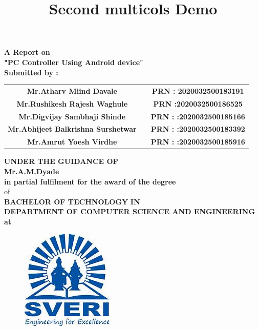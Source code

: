 \documentclass[12pt]{article}
\title{Second multicols Demo}
\begin{document}
 \begin{center}
 \large \textbf {A Report on}\\[2mm]
 \LARGE \textbf {"PC Controller Using Android device"}\\[2mm]
 
 \textbf{Submitted by :}\\[2mm]
 \end{center}
 
 
 \begin{tabular}{ c c c } 
 \textbf{Mr.Atharv Miind Davale} & \hspace{1in} & \textbf{ PRN :  2020032500183191} \\ [1mm] 
 \textbf {Mr.Rushikesh Rajesh Waghule} & \hspace{1in} & \textbf{PRN :2020032500186525}\\[1mm]
 \textbf{ Mr.Digvijay Sambhaji Shinde } & \hspace{1in}  & \textbf{PRN : :2020032500185166}\\[1mm]
\textbf{ Mr.Abhijeet Balkrishna Surshetwar} & \hspace{1in}  & \textbf{PRN : :2020032500183392}\\[1mm]
\textbf{ Mr.Amrut Yoesh Virdhe} & \hspace{1in}  & \textbf{PRN : :2020032500185916}\\[7mm] 
\end{tabular} 
 
 
 
 \begin{center}
 \large \textbf {UNDER THE GUIDANCE OF }\\[2mm]
 \large \textbf {Mr.A.M.Dyade}\\[7mm]
 \textbf {in partial fulfilment for the award of the degree} \\[2mm] of \\[2mm]
 
 \large \textbf {BACHELOR OF TECHNOLOGY}
 \textbf {IN}\\[2mm]
 \textbf {DEPARTMENT OF COMPUTER SCIENCE AND ENGINEERING}\\
 \textbf {at}
 \end{center}
 
 \begin{figure}[h]
 \centering
 \includegraphics[scale=1]{sveri2logo}
\end{figure} 
\end{document}
